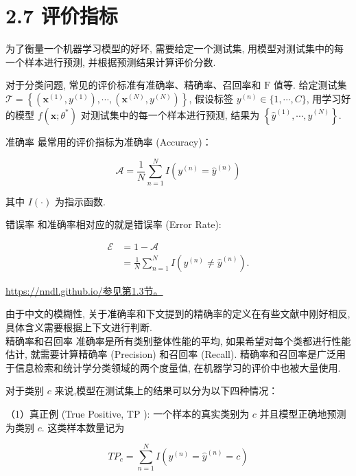 \documentclass[10pt]{article}
\begin{document}
\section*{2.7 评价指标}
为了衡量一个机器学习模型的好坏, 需要给定一个测试集, 用模型对测试集中的每一个样本进行预测, 并根据预测结果计算评价分数.

对于分类问题, 常见的评价标准有准确率、精确率、召回率和 $\mathrm{F}$ 值等. 给定测试集 $\mathcal{T}=\left\{\left(\boldsymbol{x}^{(1)}, y^{(1)}\right), \cdots,\left(\boldsymbol{x}^{(N)}, y^{(N)}\right)\right\}$, 假设标签 $y^{(n)} \in\{1, \cdots, C\}$, 用学习好的模型 $f\left(\boldsymbol{x} ; \theta^{*}\right)$ 对测试集中的每一个样本进行预测, 结果为 $\left\{\hat{y}^{(1)}, \cdots, \hat{y}^{(N)}\right\}$.

准确率 最常用的评价指标为准确率 (Accuracy)：


\begin{equation*}
\mathcal{A}=\frac{1}{N} \sum_{n=1}^{N} I\left(y^{(n)}=\hat{y}^{(n)}\right) \tag{2.73}
\end{equation*}


其中 $I(\cdot)$ 为指示函数.

错误率 和准确率相对应的就是错误率 (Error Rate):


\begin{align*}
\mathcal{E} & =1-\mathcal{A}  \tag{2.74}\\
& =\frac{1}{N} \sum_{n=1}^{N} I\left(y^{(n)} \neq \hat{y}^{(n)}\right) . \tag{2.75}
\end{align*}


\href{https://nndl.github.io/%E5%8F%82%E8%A7%81%E7%AC%AC1.3%E8%8A%82%E3%80%82}{https://nndl.github.io/参见第1.3节。}

由于中文的模糊性, 关于准确率和下文提到的精确率的定义在有些文献中刚好相反, 具体含义需要根据上下文进行判断.\\
精确率和召回率 准确率是所有类别整体性能的平均, 如果希望对每个类都进行性能估计, 就需要计算精确率 (Precision) 和召回率 (Recall). 精确率和召回率是广泛用于信息检索和统计学分类领域的两个度量值, 在机器学习的评价中也被大量使用.

对于类别 $c$ 来说,模型在测试集上的结果可以分为以下四种情况：

（1）真正例 (True Positive, TP ): 一个样本的真实类别为 $c$ 并且模型正确地预测为类别 $c$. 这类样本数量记为


\begin{equation*}
T P_{c}=\sum_{n=1}^{N} I\left(y^{(n)}=\hat{y}^{(n)}=c\right) \tag{2.76}
\end{equation*}
\end{document}
